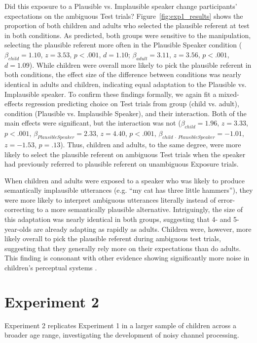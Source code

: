 \documentclass[man,floatsintext]{apa6}
\begin{document}
Did this exposure to a Plausible vs. Implausible speaker change participants' expectations on the ambiguous Test trials? Figure~\ref{fig:exp1_results} shows the proportion of both children and adults who selected the plausible referent at test in both conditions. As predicted, both groups were sensitive to the manipulation, selecting the plausible referent more often in the Plausible Speaker condition ($\beta_{child} = 1.10$, $z = 3.53$, $p <.001$, $d = 1.10$; $\beta_{adult} = 3.11$, $z = 3.56$, $p <.001$, $d = 1.09$). While children were overall more likely to pick the plausible referent in both conditions, the effect size of the difference between conditions was nearly identical in adults and children, indicating equal adaptation to the Plausible vs. Implausible speaker. To confirm these findings formally, we again fit a mixed-effects regression predicting choice on Test trials from group (child vs. adult), condition (Plausible vs. Implausible Speaker), and their interaction. Both of the main effects were significant, but the interaction was not ($\beta_{child} = 1.96$,  $z = 3.33$, $p <.001$, $\beta_{Plausible Speaker} = 2.33$,  $z = 4.40$, $p <.001$,  $\beta_{child \: \cdot \: Plausible Speaker} = -1.01$,  $z = -1.53$, $p = .13$). Thus, children and adults, to the same degree, were more likely to select the plausible referent on ambiguous Test trials when the speaker had previously referred to plausible referent on unambiguous Exposure trials.

When children and adults were exposed to a speaker who was likely to produce semantically implausible utterances (e.g. ``my cat has three little hammers''), they were more likely to interpret ambiguous utterances literally instead of error-correcting to a more semantically plausible alternative. Intriguingly, the size of this adaptation was nearly identical in both groups, suggesting that 4- and 5-year-olds are already adapting as rapidly as adults. Children were, however, more likely overall to pick the plausible referent during ambiguous test trials, suggesting that they generally rely more on their expectations than do adults. This finding is consonant with other evidence showing significantly more noise in children's perceptual systems \cite{neuman1983}.

\section{Experiment 2}

Experiment 2 replicates Experiment 1 in a larger sample of children across a broader age range, investigating the development of noisy channel processing.
\end{document}
